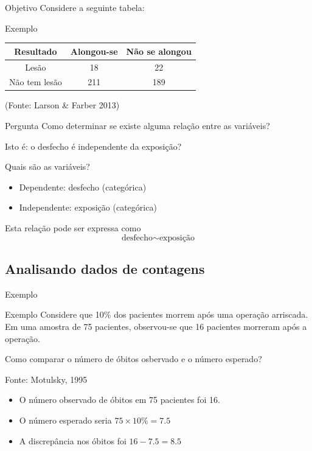 \documentclass{beamer}
\begin{document}
\begin{frame}{Objetivo}
Considere a seguinte tabela:
  \begin{exampleblock}{Exemplo}
    \begin{tabular}{c|c|c}
      Resultado & Alongou-se & Não se alongou\\
      \hline
      Lesão & 18 & 22\\
      \hline
      Não tem lesão & 211 & 189\\
    \end{tabular}

    (Fonte: Larson \& Farber 2013)
  \end{exampleblock}
  \begin{block}{Pergunta}
    \small
    Como determinar se existe alguma relação entre as variáveis?

    \bigskip
    Isto é: o desfecho é independente da exposição?
  \end{block}
\end{frame}

\begin{frame}{Quais são as variáveis?}
  \begin{itemize}
    \small
  \item Dependente: desfecho (categórica)
  \item Independente: exposição (categórica)
  \end{itemize}
  \vfill
  \begin{block}{Esta relação pode ser expressa como}
    \begin{displaymath}
      \text{desfecho} \sim \text{exposição}
    \end{displaymath}
  \end{block}
\end{frame}

\subsection{Analisando dados de contagens}

\begin{frame}{Exemplo}
  \begin{exampleblock}{Exemplo}
    Considere que 10\% dos pacientes morrem após uma operação
    arriscada. Em uma amostra de 75 pacientes, observou-se que 16
    pacientes morreram após a operação.

    Como comparar o número de óbitos osbervado e o número esperado?

    Fonte: Motulsky, 1995
  \end{exampleblock}
  \begin{itemize}
  \item O número observado de óbitos em 75 pacientes foi 16.
  \item O número esperado seria $75 \times 10\% = 7.5$
  \item A discrepância nos óbitos foi $16-7.5 = 8.5$
  \end{itemize}
\end{frame}
\end{document}
